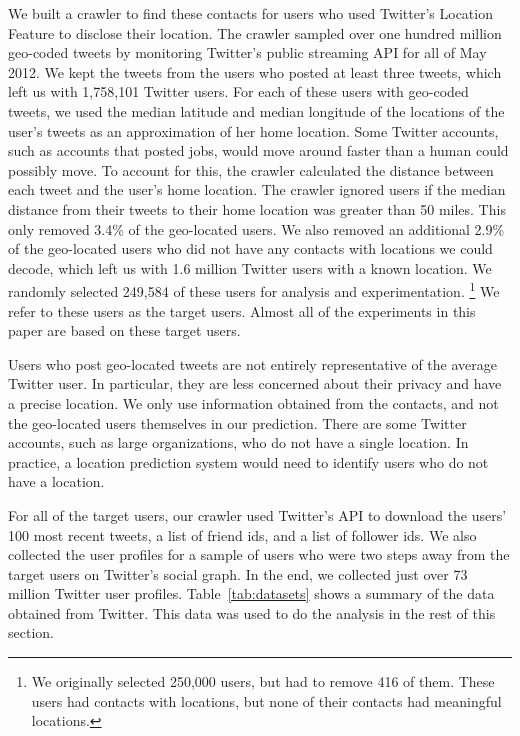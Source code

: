 \documentclass{sig-alternate}
\begin{document}
We built a crawler to find these contacts for users who used Twitter's Location
Feature to disclose their location.
%
The crawler sampled over one hundred million geo-coded tweets by monitoring
Twitter's public streaming API for all of May 2012.
We kept the tweets from the users who posted at least three tweets, which left
us with 1,758,101 Twitter users.
%
For each of these users with geo-coded tweets, we used the median latitude and
median longitude of the locations of the user's tweets as an approximation of
her home location.
%
Some Twitter accounts, such as accounts that posted jobs, would
move around faster than a human could possibly move.
%
To account for this, the crawler calculated the distance between each tweet and
the user's home location.
%
The crawler ignored users if the median distance from their tweets to their
home location was greater than 50 miles.
%
This only removed 3.4\% of the geo-located users.
%
We also removed an additional 2.9\% of the geo-located users who did not have
any contacts with locations we could decode, which left us with 1.6 million
Twitter users with a known location.
%
We randomly selected 249,584 of these users for analysis and experimentation.
\footnote{We originally selected 250,000 users, but had to remove 416 of them.
These users had contacts with locations, but none of their contacts had
meaningful locations.}
%
We refer to these users as the target users.
%
Almost all of the experiments in this paper are based on these target
users.

Users who post geo-located tweets are not entirely representative of the
average Twitter user.
%
In particular, they are less concerned about their privacy and have a precise
location.
%
We only use information obtained from the contacts, and not the geo-located
users themselves in our prediction.
%
There are some Twitter accounts, such as large organizations, who do not have a
single location.
%
In practice, a location prediction system would need to identify users who do
not have a location.




For all of the target users, our crawler used Twitter's API to download
the users' 100 most recent tweets, a list of friend ids, and a list of follower ids.
%
We also collected the user profiles for a sample of users who were two steps
away from the target users on Twitter's social graph.
%
In the end, we collected just over 73 million Twitter user profiles.
%
Table~\ref{tab:datasets} shows a summary of the data obtained from Twitter.
%
This data was used to do the analysis in the rest of this section.
\end{document}
